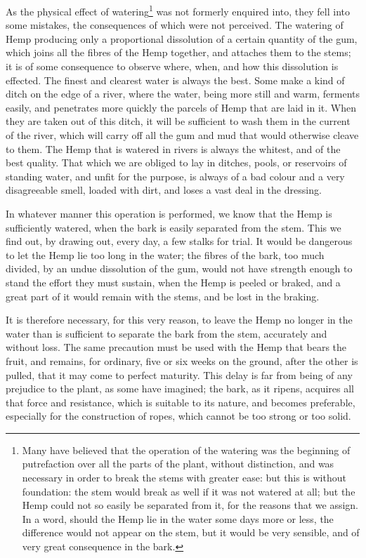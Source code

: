 \documentclass[a4paper, 11pt, oneside, polutonikogreek, english]{article}
\begin{document}
As the physical effect of watering\footnote{Many have believed that the operation of the watering was the beginning of putrefaction over all the parts of the plant, without distinction, and was necessary in order to break the stems with greater ease: but this is without foundation: the stem would break as well if it was not watered at all; but the Hemp could not so easily be separated from it, for the reasons that we assign. In a word, should the Hemp lie in the water some days more or less, the difference would not appear on the stem, but it would be very sensible, and of very great consequence in the bark.} was not formerly enquired into, they fell into some mistakes, the consequences of which were not perceived. The watering of Hemp producing only a proportional dissolution of a certain quantity of the gum, which joins all the fibres of the Hemp together, and attaches them to the stems; it is of some consequence to observe where, when, and how this dissolution is effected. The finest and clearest water is always the best. Some make a kind of ditch on the edge of a river, where the water, being more still and warm, ferments easily, and penetrates more quickly the parcels of Hemp that are laid in it. When they are taken out of this ditch, it will be sufficient to wash them in the current of the river, which will carry off all the gum and mud that would otherwise cleave to them. The Hemp that is watered in rivers is always the whitest, and of the best quality. That which we are obliged to lay in ditches, pools, or reservoirs of standing water, and unfit for the purpose, is always of a bad colour and a very disagreeable smell, loaded with dirt, and loses a vast deal in the dressing.

In whatever manner this operation is performed, we know that the Hemp is sufficiently watered, when the bark is easily separated from the stem. This we find out, by drawing out, every day, a few stalks for trial. It would be dangerous to let the Hemp lie too long in the water; the fibres of the bark, too much divided, by an undue dissolution of the gum, would not have strength enough to stand the effort they must sustain, when the Hemp is peeled or braked, and a great part of it would remain with the stems, and be lost in the braking.

It is therefore necessary, for this very reason, to leave the Hemp no longer in the water than is sufficient to separate the bark from the stem, accurately and without loss. The same precaution must be used with the Hemp that bears the fruit, and remains, for ordinary, five or six weeks on the ground, after the other is pulled, that it may come to perfect maturity. This delay is far from being of any prejudice to the plant, as some have imagined; the bark, as it ripens, acquires all that force and resistance, which is suitable to its nature, and becomes preferable, especially for the construction of ropes, which cannot be too strong or too solid.
\end{document}

